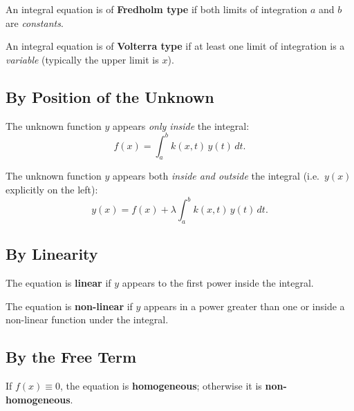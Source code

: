 \begin{definition}
An integral equation is of \textbf{Fredholm type} if both limits of integration $a$ and $b$ are \emph{constants}.
\end{definition}

\begin{definition}
An integral equation is of \textbf{Volterra type} if at least one limit of integration is a \emph{variable} (typically the upper limit is $x$).
\end{definition}

\subsection{By Position of the Unknown}

\begin{definition}
The unknown function $y$ appears \emph{only inside} the integral:
\[
  f(x) = \int_a^b k(x,t)\,y(t)\,dt.
\]
\end{definition}

\begin{definition}
The unknown function $y$ appears both \emph{inside and outside} the integral (i.e.\ $y(x)$ explicitly on the left):
\[
  y(x) = f(x) + \lambda\int_a^b k(x,t)\,y(t)\,dt.
\]
\end{definition}

\subsection{By Linearity}

\begin{definition}
The equation is \textbf{linear} if $y$ appears to the first power inside the integral.
\end{definition}

\begin{definition}
The equation is \textbf{non-linear} if $y$ appears in a power greater than one or inside a non-linear function under the integral.
\end{definition}

\subsection{By the Free Term}

\begin{definition}
If $f(x) \equiv 0$, the equation is \textbf{homogeneous}; otherwise it is \textbf{non-homogeneous}.
\end{definition}

